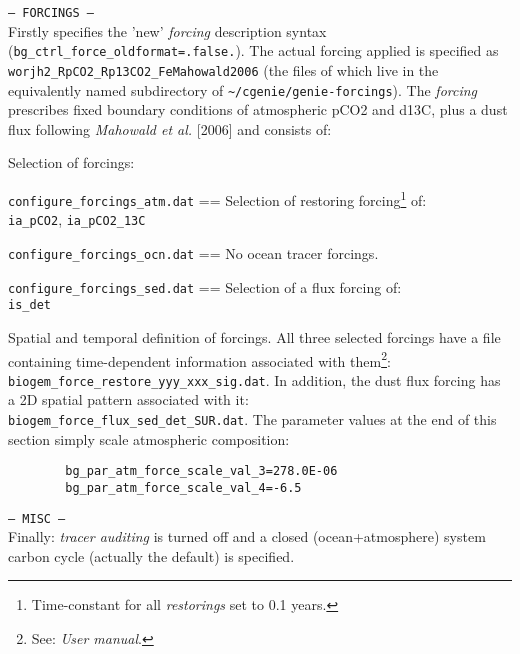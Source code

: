 \documentclass[10pt,twoside]{article}
\begin{document}
\begin{compactitem}
	\item \texttt{--- FORCINGS ---}
	\\ Firstly specifies the 'new' \textit{forcing} description syntax (\texttt{bg\_ctrl\_force\_oldformat=.false.}). The actual forcing applied is specified as \texttt{worjh2\_RpCO2\_Rp13CO2\_FeMahowald2006} (the files of which live in the equivalently named subdirectory of \texttt{\~{}/cgenie/genie-forcings}). The \textit{forcing} prescribes fixed boundary conditions of atmospheric pCO2 and d13C, plus a dust flux following \textit{Mahowald et al.} [2006] and consists of:
	\begin{compactitem}
		\item Selection of forcings:
		\begin{compactenum}
			\item  \texttt{configure\_forcings\_atm.dat} == Selection of restoring forcing\footnote{Time-constant for all \textit{restorings} set to 0.1 years.} of:
			\\\texttt{ia\_pCO2}, \texttt{ia\_pCO2\_13C}
			\item  \texttt{configure\_forcings\_ocn.dat} == No ocean tracer forcings.
			\item  \texttt{configure\_forcings\_sed.dat} == Selection of a flux forcing of:
			\\\texttt{is\_det}
		\end{compactenum}
		\item Spatial and temporal definition of forcings. All three selected forcings have a file containing time-dependent information associated with them\footnote{See: \textit{User manual}.}: \texttt{biogem\_force\_restore\_yyy\_xxx\_sig.dat}. In addition, the dust flux forcing has a 2D spatial pattern associated with it:
		\\ \texttt{biogem\_force\_flux\_sed\_det\_SUR.dat}.
		The parameter values at the end of this section simply scale atmospheric composition:
		\vspace{-5pt}\begin{verbatim}
		bg_par_atm_force_scale_val_3=278.0E-06
		bg_par_atm_force_scale_val_4=-6.5
		\end{verbatim}\vspace{-5pt}
	\end{compactitem}
		
	\item \texttt{--- MISC ---}
	\\ Finally: \textit{tracer auditing} is turned off and a closed (ocean+atmosphere) system carbon cycle (actually the default) is specified.
	
\end{compactitem}
\end{document}
